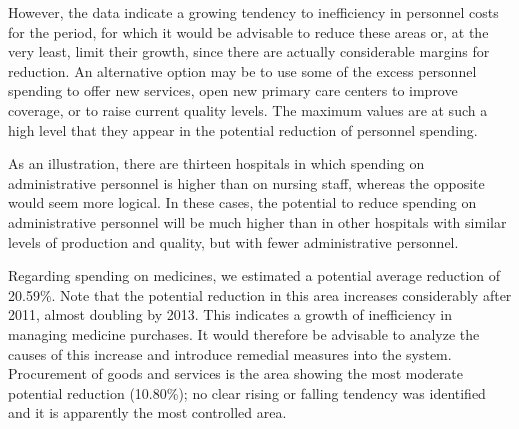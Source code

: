 \documentclass[11pt,a4paper,oneside]{article}
\begin{document}
However, the data indicate a growing tendency to inefficiency in personnel costs for the period, for which it would be advisable to reduce these areas or, at the very least, limit their growth, since there are actually considerable margins for reduction. An alternative option may be to use some of the excess personnel spending to offer new services, open new primary care centers to improve coverage, or to raise current quality levels. The maximum values are at such a high level that they appear in the potential reduction of personnel spending.


As an illustration, there are thirteen hospitals in which spending on administrative personnel is higher than on nursing staff, whereas the opposite would seem more logical. In these cases, the potential to reduce spending on administrative personnel will be much higher than in other hospitals with similar levels of production and quality, but with fewer administrative personnel.


\color{black}



Regarding spending on medicines, we estimated a potential average reduction of 20.59\%. Note that the potential reduction in this area increases considerably after 2011, almost doubling by 2013. This indicates a growth of inefficiency in managing medicine purchases. It would therefore be advisable to analyze the causes of this increase and introduce remedial measures into the system. Procurement of goods and services is the area showing the most moderate potential reduction (10.80\%); no clear rising or falling tendency was identified and it is apparently the most controlled area.
\end{document}
